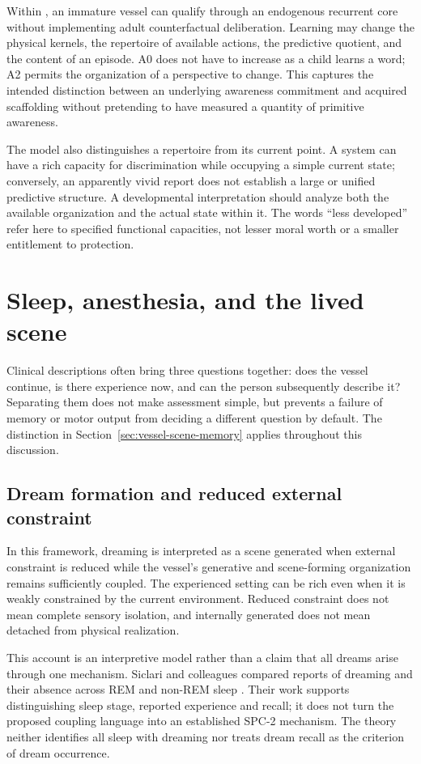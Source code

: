 Within \spctwo, an immature vessel can qualify through an endogenous recurrent core without implementing adult counterfactual deliberation. Learning may change the physical kernels, the repertoire of available actions, the predictive quotient, and the content of an episode. A0 does not have to increase as a child learns a word; A2 permits the organization of a perspective to change. This captures the intended distinction between an underlying awareness commitment and acquired scaffolding without pretending to have measured a quantity of primitive awareness.

The model also distinguishes a repertoire from its current point. A system can have a rich capacity for discrimination while occupying a simple current state; conversely, an apparently vivid report does not establish a large or unified predictive structure. A developmental interpretation should analyze both the available organization and the actual state within it. The words ``less developed'' refer here to specified functional capacities, not lesser moral worth or a smaller entitlement to protection.

\section{Sleep, anesthesia, and the lived scene}\label{section:comparative:sleep-anesthesia-and-the-report-boundary}
Clinical descriptions often bring three questions together: does the vessel continue, is there experience now, and can the person subsequently describe it? Separating them does not make assessment simple, but prevents a failure of memory or motor output from deciding a different question by default. The distinction in Section~\ref{sec:vessel-scene-memory} applies throughout this discussion.

\subsection{Dream formation and reduced external constraint}\label{sec:dream-formation}
In this framework, dreaming is interpreted as a scene generated when external constraint is reduced while the vessel's generative and scene-forming organization remains sufficiently coupled. The experienced setting can be rich even when it is weakly constrained by the current environment. Reduced constraint does not mean complete sensory isolation, and internally generated does not mean detached from physical realization.

This account is an interpretive model rather than a claim that all dreams arise through one mechanism. Siclari and colleagues compared reports of dreaming and their absence across REM and non-REM sleep \cite{Siclari2017}. Their work supports distinguishing sleep stage, reported experience and recall; it does not turn the proposed coupling language into an established SPC-2 mechanism. The theory neither identifies all sleep with dreaming nor treats dream recall as the criterion of dream occurrence.

